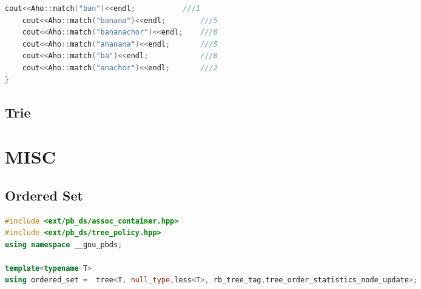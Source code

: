 \documentclass[10pt,a4paper,landscape]{article}
\begin{document}
\begin{multicols}{3}
\begin{lstlisting}[language=C++, breaklines=true]
    cout<<Aho::match("ban")<<endl;           ///1
    cout<<Aho::match("banana")<<endl;        ///5
    cout<<Aho::match("bananachor")<<endl;    ///6
    cout<<Aho::match("ananana")<<endl;       ///5
    cout<<Aho::match("ba")<<endl;            ///0
    cout<<Aho::match("anachor")<<endl;       ///2
}
\end{lstlisting}

\subsection{Trie}

\section{MISC}

\subsection{Ordered Set}
\begin{lstlisting}[language=C++, breaklines=true]
#include <ext/pb_ds/assoc_container.hpp>
#include <ext/pb_ds/tree_policy.hpp>
using namespace __gnu_pbds;

template<typename T>
using ordered_set =  tree<T, null_type,less<T>, rb_tree_tag,tree_order_statistics_node_update>;
\end{lstlisting}

\end{multicols}
\end{document}
